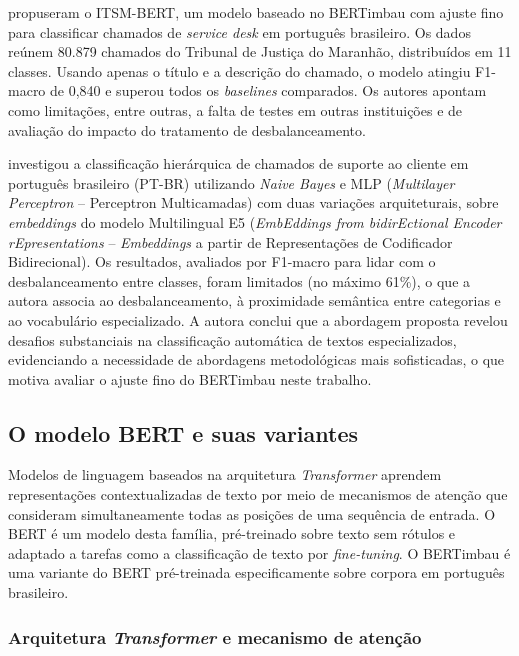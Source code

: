 \documentclass[
    12pt,                %
    openright,           %
    oneside,             %
    a4paper,             %
    english,             %
    brazil               %
]{abntex2}
\begin{document}
 propuseram o ITSM-BERT, um modelo baseado no BERTimbau com ajuste fino para classificar chamados de \textit{service desk} em português brasileiro. Os dados reúnem 80.879 chamados do Tribunal de Justiça do Maranhão, distribuídos em 11 classes. Usando apenas o título e a descrição do chamado, o modelo atingiu F1-macro de 0,840 e superou todos os \textit{baselines} comparados. Os autores apontam como limitações, entre outras, a falta de testes em outras instituições e de avaliação do impacto do tratamento de desbalanceamento.

 investigou a classificação hierárquica de chamados de suporte ao cliente em português brasileiro (PT-BR) utilizando \textit{Naive Bayes} e MLP (\textit{Multilayer Perceptron} -- Perceptron Multicamadas) com duas variações arquiteturais, sobre \textit{embeddings} do modelo Multilingual E5 (\textit{EmbEddings from bidirEctional Encoder rEpresentations} -- \textit{Embeddings} a partir de Representações de Codificador Bidirecional). Os resultados, avaliados por F1-macro para lidar com o desbalanceamento entre classes, foram limitados (no máximo 61\%), o que a autora associa ao desbalanceamento, à proximidade semântica entre categorias e ao vocabulário especializado. A autora conclui que a abordagem proposta revelou desafios substanciais na classificação automática de textos especializados, evidenciando a necessidade de abordagens metodológicas mais sofisticadas, o que motiva avaliar o ajuste fino do BERTimbau neste trabalho.

\subsection{O modelo BERT e suas variantes}

Modelos de linguagem baseados na arquitetura \textit{Transformer} \cite{vaswani2017} aprendem representações contextualizadas de texto por meio de mecanismos de atenção que consideram simultaneamente todas as posições de uma sequência de entrada. O BERT \cite{devlin2019} é um modelo desta família, pré-treinado sobre texto sem rótulos e adaptado a tarefas como a classificação de texto por \textit{fine-tuning}. O BERTimbau \cite{souza2020} é uma variante do BERT pré-treinada especificamente sobre corpora em português brasileiro.

\subsubsection{Arquitetura \textit{Transformer} e mecanismo de atenção}
\label{subsec:bert_transformer}
\end{document}
